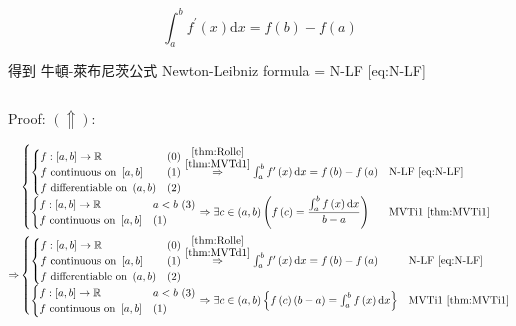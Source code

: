 \documentclass[
]{book}
\theoremstyle{definition}
\theoremstyle{definition}
\theoremstyle{definition}
\theoremstyle{definition}
\theoremstyle{remark}
\begin{document}
\[
\int_{a}^{b}f^{\prime}\left(x\right)\mathrm{d}x=f\left(b\right)-f\left(a\right)
\]

\begin{CJK}{UTF8}{bsmi}
得到 牛頓-萊布尼茨公式 Newton-Leibniz formula = N-LF [eq:N-LF]
\end{CJK}

\[
\tag*{$\Box$}
\]

Proof: \(\left(\Uparrow\right)\):

\[
\begin{aligned}
 & \begin{cases}
\begin{cases}
f:\left[a,b\right]\rightarrow\mathbb{R} & \left(0\right)\\
f\text{ continuous on }\left[a,b\right] & \left(1\right)\\
f\text{ differentiable on }\left(a,b\right) & \left(2\right)
\end{cases}\overset{\stackrel{\ref{thm:Rolle}}{\ref{thm:MVTd1}}}{\Rightarrow}\int_{a}^{b}f^{\prime}\left(x\right)\mathrm{d}x=f\left(b\right)-f\left(a\right) & \text{N-LF }\ref{eq:N-LF}\\
\begin{cases}
f:\left[a,b\right]\rightarrow\mathbb{R} & a<b\,\left(3\right)\\
f\text{ continuous on }\left[a,b\right] & \left(1\right)
\end{cases}\Rightarrow\exists c\in\left(a,b\right)\left(f\left(c\right)=\dfrac{\int_{a}^{b}f\left(x\right)\mathrm{d}x}{b-a}\right) & \text{MVTi1 }\ref{thm:MVTi1}
\end{cases}\\
\Rightarrow & \begin{cases}
\begin{cases}
f:\left[a,b\right]\rightarrow\mathbb{R} & \left(0\right)\\
f\text{ continuous on }\left[a,b\right] & \left(1\right)\\
f\text{ differentiable on }\left(a,b\right) & \left(2\right)
\end{cases}\overset{\stackrel{\ref{thm:Rolle}}{\ref{thm:MVTd1}}}{\Rightarrow}\int_{a}^{b}f^{\prime}\left(x\right)\mathrm{d}x=f\left(b\right)-f\left(a\right) & \text{N-LF }\ref{eq:N-LF}\\
\begin{cases}
f:\left[a,b\right]\rightarrow\mathbb{R} & a<b\,\left(3\right)\\
f\text{ continuous on }\left[a,b\right] & \left(1\right)
\end{cases}\Rightarrow\exists c\in\left(a,b\right)\left\{ f\left(c\right)\left(b-a\right)=\int_{a}^{b}f\left(x\right)\mathrm{d}x\right\}  & \text{MVTi1 }\ref{thm:MVTi1}

\end{cases}
\end{aligned}\]
\end{document}
